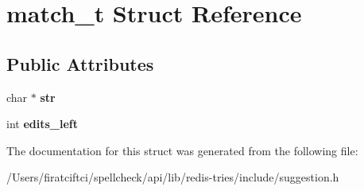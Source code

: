 \hypertarget{structmatch__t}{}\section{match\+\_\+t Struct Reference}
\label{structmatch__t}
\subsection*{Public Attributes}
\begin{DoxyCompactItemize}
\item 
\mbox{\label{structmatch__t_aa66a1f7f9d8d050867ceea0e6ae8e9b9}} 
char $\ast$ {\bfseries str}
\item 
\mbox{\label{structmatch__t_a7da88d3112f403858d4952f697e5061b}} 
int {\bfseries edits\+\_\+left}
\end{DoxyCompactItemize}


The documentation for this struct was generated from the following file\+:\begin{DoxyCompactItemize}
\item 
/\+Users/firatciftci/spellcheck/api/lib/redis-\/tries/include/suggestion.\+h\end{DoxyCompactItemize}
